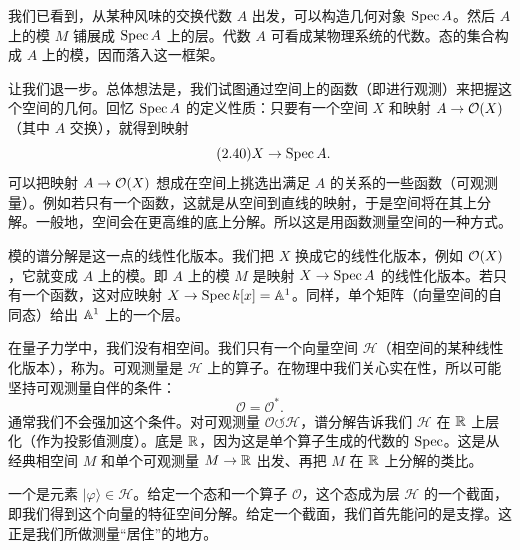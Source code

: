 我们已看到，从某种风味的交换代数 $A$ 出发，可以构造几何对象 $\mathrm{Spec}\,A$。然后 $A$ 上的模 $M$ 铺展成 $\mathrm{Spec}\,A$ 上的层。代数 $A$ 可看成某物理系统的代数。态的集合构成 $A$ 上的模，因而落入这一框架。

让我们退一步。总体想法是，我们试图通过空间上的函数（即进行观测）来把握这个空间的几何。回忆 $\mathrm{Spec}\,A$ 的定义性质：只要有一个空间 $X$ 和映射 $A\to\mathcal{O}(X)$（其中 $A$ 交换），就得到映射
\begin{equation}\tag{2.40}
X\to\mathrm{Spec}\,A.
\end{equation}
可以把映射 $A\to\mathcal{O}(X)$ 想成在空间上挑选出满足 $A$ 的关系的一些函数（可观测量）。例如若只有一个函数，这就是从空间到直线的映射，于是空间将在其上分解。一般地，空间会在更高维的底上分解。所以这是用函数测量空间的一种方式。

模的谱分解是这一点的线性化版本。我们把 $X$ 换成它的线性化版本，例如 $\mathcal{O}(X)$，它就变成 $A$ 上的模。即 $A$ 上的模 $M$ 是映射 $X\to\mathrm{Spec}\,A$ 的线性化版本。若只有一个函数，这对应映射 $X\to\mathrm{Spec}\,k[x]=\mathbb{A}^1$。同样，单个矩阵（向量空间的自同态）给出 $\mathbb{A}^1$ 上的一个层。

在量子力学中，我们没有相空间。我们只有一个向量空间 $\mathcal{H}$（相空间的某种线性化版本），称为。可观测量是 $\mathcal{H}$ 上的算子。在物理中我们关心实在性，所以可能坚持可观测量自伴的条件：
\begin{equation}\tag{2.41}
\mathcal{O}=\mathcal{O}^{*}.
\end{equation}
通常我们不会强加这个条件。对可观测量 $\mathcal{O}\circlearrowleft\mathcal{H}$，谱分解告诉我们 $\mathcal{H}$ 在 $\mathbb{R}$ 上层化（作为投影值测度）。底是 $\mathbb{R}$，因为这是单个算子生成的代数的 $\mathrm{Spec}$。这是从经典相空间 $M$ 和单个可观测量 $M\to\mathbb{R}$ 出发、再把 $M$ 在 $\mathbb{R}$ 上分解的类比。

一个是元素 $|\varphi\rangle\in\mathcal{H}$。给定一个态和一个算子 $\mathcal{O}$，这个态成为层 $\mathcal{H}$ 的一个截面，即我们得到这个向量的特征空间分解。给定一个截面，我们首先能问的是支撑。这正是我们所做测量“居住”的地方。

